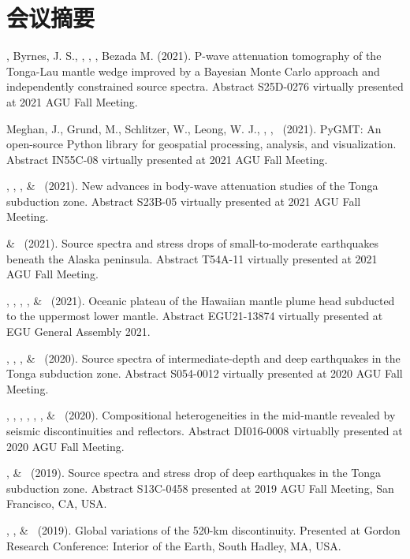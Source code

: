 \section{会议摘要}

\begin{etaremune}
\item \YZhang, Byrnes, J. S., \SWei, \Me, \FWang, Bezada M. (2021).
    P-wave attenuation tomography of the Tonga-Lau mantle wedge improved
    by a Bayesian Monte Carlo approach and independently constrained source spectra.
    Abstract S25D-0276 virtually presented at 2021 AGU Fall Meeting.
\item Meghan, J., Grund, M., Schlitzer, W., Leong, W. J., \Me, \JYao, \LUieda\ (2021).
    PyGMT: An open-source Python library for geospatial processing, analysis, and visualization.
    Abstract IN55C-08 virtually presented at 2021 AGU Fall Meeting.
\item \SWei, \YZhang, \Me, \& \DWiens\ (2021).
    New advances in body-wave attenuation studies of the Tonga subduction zone.
    Abstract S23B-05 virtually presented at 2021 AGU Fall Meeting.
\item \Me \& \SWei\ (2021).
    Source spectra and stress drops of small-to-moderate earthquakes beneath the Alaska peninsula.
    Abstract T54A-11 virtually presented at 2021 AGU Fall Meeting.
\item \SWei, \PShearer, \CLithgowBertelloni, \LStixrude, \& \Me\ (2021).
	Oceanic plateau of the Hawaiian mantle plume head subducted to the uppermost lower mantle.
	Abstract EGU21-13874 virtually presented at EGU General Assembly 2021.
\item \Me, \WWang, \FWang, \& \SWei\ (2020).
	Source spectra of intermediate-depth and deep earthquakes in the Tonga subduction zone.
	Abstract S054-0012 virtually presented at 2020 AGU Fall Meeting.
\item \SWei, \Me, \PShearer, \MLv, \SDorfman, \CLithgowBertelloni, \& \LStixrude\ (2020).
	Compositional heterogeneities in the mid-mantle revealed by seismic discontinuities and reflectors.
	Abstract DI016-0008 virtuablly presented at 2020 AGU Fall Meeting.
\item \Me, \WWang \& \SWei\ (2019).
	Source spectra and stress drop of deep earthquakes in the Tonga subduction zone.
	Abstract S13C-0458 presented at 2019 AGU Fall Meeting, San Francisco, CA, USA.
\item
    \Me, \SWei, \& \PShearer\ (2019).
    Global variations of the 520-km discontinuity.
    Presented at Gordon Research Conference: Interior of the Earth, South Hadley, MA, USA.

\end{etaremune}
